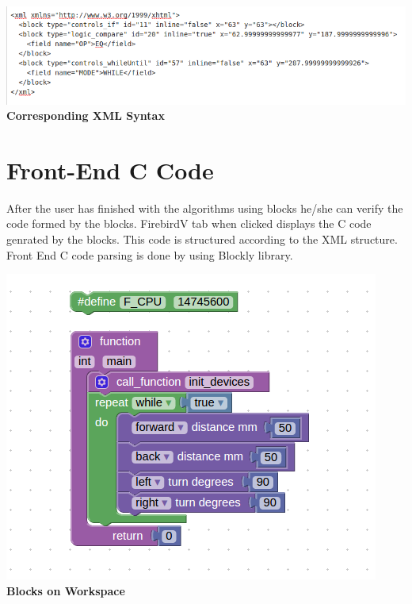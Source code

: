 \documentclass[a4paper,10pt]{report}
\begin{document}
    \begin{center}
    \includegraphics[scale =0.5]{images/xml.png}\\[.3in]
    \textbf{Corresponding XML Syntax}
    \end{center}
    \newpage
    \section{Front-End C Code}
    After the user has finished with the algorithms using blocks he/she can verify the code formed by the blocks.
    FirebirdV tab when clicked displays the C code genrated by the blocks. This code is structured according to the XML structure.
    Front End  C code parsing is done by using Blockly library. \\
    
    \begin{center}
    \includegraphics[scale =0.6]{images/code.png}\\[.1in]
    \textbf{Blocks on Workspace}\\[1in]
    \end{center}
\end{document}
